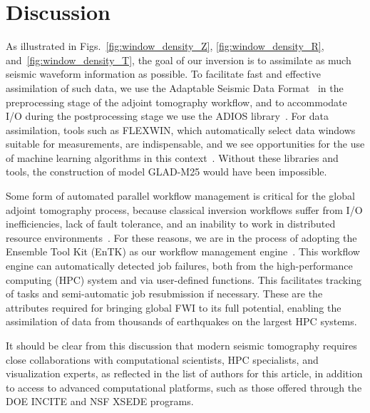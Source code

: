 \documentclass[extra,mreferee]{gji}
\begin{document}
\section{Discussion}

As illustrated in Figs.~\ref{fig:window_density_Z}, \ref{fig:window_density_R}, and~\ref{fig:window_density_T},
the goal of our inversion is to assimilate as much seismic waveform information as possible.
To facilitate fast and effective assimilation of such data,
we use the Adaptable Seismic Data Format~\citep{krischer2016adaptable} in the preprocessing stage of the adjoint tomography workflow,
and to accommodate I/O during the postprocessing stage we use the ADIOS library~\citep{liu2014hello}.
For data assimilation,
tools such as FLEXWIN, which automatically select data windows suitable for measurements, are indispensable, and we see opportunities for the use of machine learning algorithms in this context~\citep[e.g.,][]{chen2017}.
Without these libraries and tools, the construction of model GLAD-M25 would have been impossible. 

Some form of automated parallel workflow management is critical for the global adjoint tomography process,
because classical inversion workflows suffer from I/O inefficiencies, lack of fault tolerance, and an inability to work in distributed resource environments~\citep{Lefebvre2018}.
For these reasons, we are in the process of adopting the Ensemble Tool Kit (EnTK) as our
workflow management engine~\citep{EnTK2017}.
This workflow engine can automatically detected job failures,
both from the high-performance computing (HPC) system and via user-defined functions.
This facilitates tracking of tasks and semi-automatic job resubmission if necessary.
These are the attributes required for bringing global FWI to its full potential,
enabling the assimilation of data from thousands of earthquakes on the largest HPC systems.

It should be clear from this discussion that modern seismic tomography requires close collaborations with computational scientists, HPC specialists, and visualization experts,
as reflected in the list of authors for this article, in addition to access to advanced computational platforms,
such as those offered through the DOE INCITE and NSF XSEDE programs.
\end{document}
